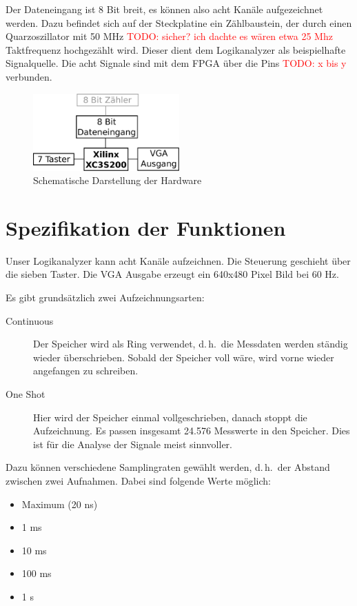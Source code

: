\documentclass[IN,ngerman,utf8,12pt]{tumbook}
\newcommand\todo[1]{\textcolor{red}{TODO: #1}}
\newcommand{\dah}{d.\,h.\ }
\begin{document}
Der Dateneingang ist 8 Bit breit, es können also acht Kanäle aufgezeichnet werden.
Dazu befindet sich auf der Steckplatine ein Zählbaustein, der durch einen Quarzoszillator mit 50 MHz \todo{sicher? ich dachte es wären etwa 25 Mhz} Taktfrequenz hochgezählt wird.
Dieser dient dem Logikanalyzer als beispielhafte Signalquelle.
Die acht Signale sind mit dem FPGA über die Pins \todo{x bis y} verbunden.

\begin{figure}
    \centerline{
        \includegraphics[width=0.5\textwidth]{img/hardware}
    }
    \caption{Schematische Darstellung der Hardware}
\end{figure}

\chapter{Spezifikation der Funktionen}

Unser Logikanalyzer kann acht Kanäle aufzeichnen.
Die Steuerung geschieht über die sieben Taster.
Die VGA Ausgabe erzeugt ein 640x480 Pixel Bild bei 60 Hz.

Es gibt grundsätzlich zwei Aufzeichnungsarten:

\begin{description}
    \item[Continuous] Der Speicher wird als Ring verwendet, \dah die Messdaten werden ständig wieder überschrieben.
        Sobald der Speicher voll wäre, wird vorne wieder angefangen zu schreiben.
    \item[One Shot] Hier wird der Speicher einmal vollgeschrieben, danach stoppt die Aufzeichnung.
        Es passen insgesamt 24.576 Messwerte in den Speicher.
        Dies ist für die Analyse der Signale meist sinnvoller.
\end{description}

Dazu können verschiedene Samplingraten gewählt werden, \dah der Abstand zwischen zwei Aufnahmen.
Dabei sind folgende Werte möglich:

\begin{itemize}
    \item Maximum (20 ns)
    \item 1 ms
    \item 10 ms
    \item 100 ms
    \item 1 s
\end{itemize}
\end{document}
